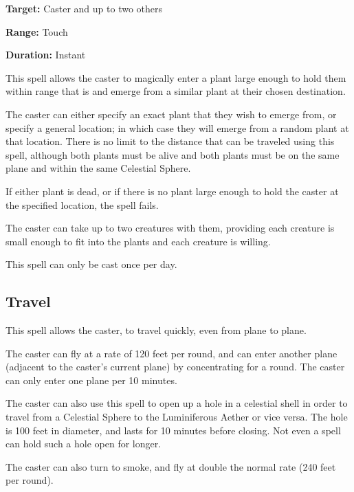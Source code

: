 \begin{multicols*}{2}
{\textbf{Target:} Caster and up to two others

\textbf{Range:} Touch

\textbf{Duration:} Instant}

This spell allows the caster to magically enter a plant large enough to hold them within range that is and emerge from a similar plant at their chosen destination.

The caster can either specify an exact plant that they wish to emerge from, or specify a general location; in which case they will emerge from a random plant at that location. There is no limit to the distance that can be traveled using this spell, although both plants must be alive and both plants must be on the same plane and within the same Celestial Sphere.

If either plant is dead, or if there is no plant large enough to hold the caster at the specified location, the spell fails.

The caster can take up to two creatures with them, providing each creature is small enough to fit into the plants and each creature is willing.

This spell can only be cast once per day.

\subsection{Travel}\label{spell:Travel}

This spell allows the caster, to travel quickly, even from plane to plane.

The caster can fly at a rate of 120 feet per round, and can enter another plane (adjacent to the caster’s current plane) by concentrating for a round. The caster can only enter one plane per 10 minutes.

The caster can also use this spell to open up a hole in a celestial shell in order to travel from a Celestial Sphere to the Luminiferous Aether or vice versa. The hole is 100 feet in diameter, and lasts for 10 minutes before closing. Not even a  spell can hold such a hole open for longer.

The caster can also turn to smoke, and fly at double the normal rate (240 feet per round).


\end{multicols*}
